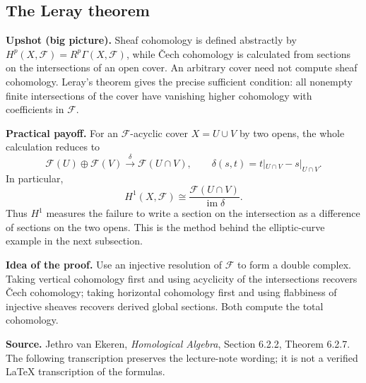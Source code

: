 \subsection{The Leray theorem}
\label{subsection-jethro-cech-2}

\noindent
{\bf Upshot (big picture).} Sheaf cohomology is defined abstractly by
$H^p(X,\mathcal F)=R^p\Gamma(X,\mathcal F)$, while
\v{C}ech cohomology is calculated from sections on the intersections
of an open cover. An arbitrary cover need not compute sheaf
cohomology. Leray's theorem gives the precise sufficient condition:
all nonempty finite intersections of the cover have vanishing
higher cohomology with coefficients in $\mathcal F$.

\medskip\noindent
{\bf Practical payoff.} For an $\mathcal F$-acyclic cover
$X=U\cup V$ by two opens, the whole calculation reduces to
\[
\mathcal F(U)\oplus\mathcal F(V)
\xrightarrow{\delta}\mathcal F(U\cap V),
\qquad
\delta(s,t)=t|_{U\cap V}-s|_{U\cap V}.
\]
In particular,
\[
H^1(X,\mathcal F)\cong
\frac{\mathcal F(U\cap V)}{\operatorname{im}\delta}.
\]
Thus $H^1$ measures the failure to write a section on the
intersection as a difference of sections on the two opens.
This is the method behind the elliptic-curve example in the
next subsection.

\medskip\noindent
{\bf Idea of the proof.} Use an injective resolution of
$\mathcal F$ to form a double complex. Taking vertical
cohomology first and using acyclicity of the intersections
recovers \v{C}ech cohomology; taking horizontal cohomology
first and using flabbiness of injective sheaves recovers
derived global sections. Both compute the total cohomology.

\medskip\noindent
{\bf Source.} Jethro van Ekeren, \emph{Homological Algebra},
Section 6.2.2, Theorem 6.2.7. The following transcription
preserves the lecture-note wording; it is not a verified
LaTeX transcription of the formulas.

